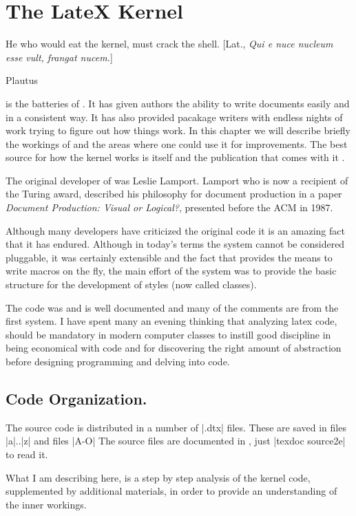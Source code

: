 \chapter{The LateX Kernel}

\epigraph{He who would eat the kernel, must crack the shell.
[Lat., \textit{Qui e nuce nucleum esse vult, frangat nucem.}]}{Plautus}

\latex is the batteries of \tex. It has given authors the ability to write documents easily and in a consistent way. It has also provided pacakage writers with endless nights of work trying to figure out how things work. In this chapter we will describe briefly the workings of \latex and the areas where one could use it for improvements. The best source for how the \latex kernel works is \latex itself and the publication that comes with it .

The original developer of \latex was Leslie Lamport. Lamport who is now a recipient of the Turing award, described his philosophy for document production in a paper \textit{Document Production: Visual or Logical?}, presented before the ACM in 1987. \parencite{lamport1987}

Although many developers have criticized the original code it is an amazing fact that it has endured. Although in today’s terms the system cannot be considered pluggable, it was
certainly extensible and the fact that \tex provides the means to write macros on the fly, the main effort
of the \latexe system was to provide the basic structure for the development of styles (now called classes).

The code was and is well documented and many of the comments are from the first system. I have spent many an
evening thinking that analyzing latex code, should be mandatory in modern computer classes to instill
good discipline in being economical with code and for discovering the right amount of abstraction before designing programming and delving into code.

\section{Code Organization.} 

The \latex source code is distributed in a number of |.dtx| files. These are saved in files |a|..|z| and files |A-O| The source files are documented in , just |texdoc source2e| to read it. 

What I am describing here, is a step by step analysis of the kernel code, supplemented by additional materials, in order to provide an understanding of  the inner workings. 


